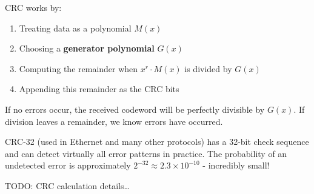 CRC works by:
\begin{enumerate}
    \item Treating data as a polynomial $M(x)$
    \item Choosing a \textbf{generator polynomial} $G(x)$
    \item Computing the remainder when $x^r \cdot M(x)$ is divided by $G(x)$
    \item Appending this remainder as the CRC bits
\end{enumerate}

\begin{importantblock}
    If no errors occur, the received codeword will be perfectly divisible by $G(x)$. If division leaves a remainder, we know errors have occurred.
\end{importantblock}

\begin{noteblock}
    CRC-32 (used in Ethernet and many other protocols) has a 32-bit check sequence and can detect virtually all error patterns in practice. The probability of an undetected error is approximately $2^{-32} \approx 2.3 \times 10^{-10}$ - incredibly small!
\end{noteblock}

TODO: CRC calculation details\ldots